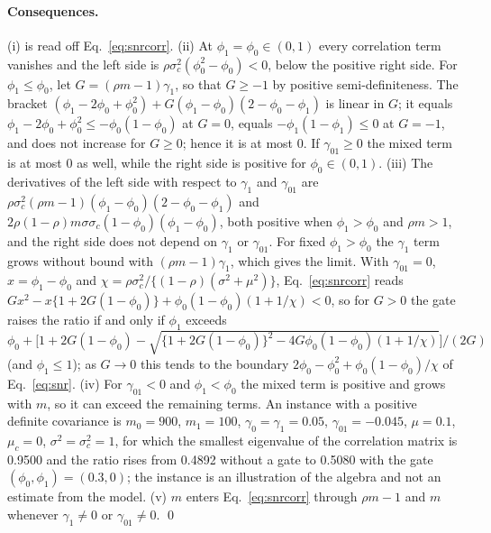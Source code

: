 \paragraph{Consequences.}
(i) is read off Eq.~\eqref{eq:snrcorr}.
(ii) At $\phi_1=\phi_0\in(0,1)$ every correlation term vanishes and the left side is $\rho\sigma_c^2(\phi_0^2-\phi_0)<0$, below the positive
right side.
For $\phi_1\le\phi_0$, let $G=(\rho m-1)\gamma_1$, so that $G\ge-1$ by positive semi-definiteness.
The bracket $(\phi_1-2\phi_0+\phi_0^2)+G(\phi_1-\phi_0)(2-\phi_0-\phi_1)$ is linear in $G$; it equals
$\phi_1-2\phi_0+\phi_0^2\le-\phi_0(1-\phi_0)$ at $G=0$, equals $-\phi_1(1-\phi_1)\le0$ at $G=-1$, and does not increase for $G\ge0$; hence it is
at most $0$.
If $\gamma_{01}\ge0$ the mixed term is at most $0$ as well, while the right side is positive for $\phi_0\in(0,1)$.
(iii) The derivatives of the left side with respect to $\gamma_1$ and $\gamma_{01}$ are
$\rho\sigma_c^2(\rho m-1)(\phi_1-\phi_0)(2-\phi_0-\phi_1)$ and $2\rho(1-\rho)m\sigma\sigma_c(1-\phi_0)(\phi_1-\phi_0)$, both positive when
$\phi_1>\phi_0$ and $\rho m>1$, and the right side does not depend on $\gamma_1$ or $\gamma_{01}$.
For fixed $\phi_1>\phi_0$ the $\gamma_1$ term grows without bound with $(\rho m-1)\gamma_1$, which gives the limit.
With $\gamma_{01}=0$, $x=\phi_1-\phi_0$ and $\chi=\rho\sigma_c^2/\{(1-\rho)(\sigma^2+\mu^2)\}$, Eq.~\eqref{eq:snrcorr} reads
$Gx^2-x\{1+2G(1-\phi_0)\}+\phi_0(1-\phi_0)(1+1/\chi)<0$, so for $G>0$ the gate raises the ratio if and only if $\phi_1$ exceeds
$\phi_0+\big[1+2G(1-\phi_0)-\sqrt{\{1+2G(1-\phi_0)\}^2-4G\phi_0(1-\phi_0)(1+1/\chi)}\big]/(2G)$ (and $\phi_1\le1$); as $G\to0$ this tends to the
boundary $2\phi_0-\phi_0^2+\phi_0(1-\phi_0)/\chi$ of Eq.~\eqref{eq:snr}.
(iv) For $\gamma_{01}<0$ and $\phi_1<\phi_0$ the mixed term is positive and grows with $m$, so it can exceed the remaining terms.
An instance with a positive definite covariance is $m_0=900$, $m_1=100$, $\gamma_0=\gamma_1=0.05$, $\gamma_{01}=-0.045$, $\mu=0.1$, $\mu_c=0$,
$\sigma^2=\sigma_c^2=1$, for which the smallest eigenvalue of the correlation matrix is 0.9500 and the ratio rises from 0.4892 without a
gate to 0.5080 with the gate $(\phi_0,\phi_1)=(0.3,0)$; the instance is an illustration of the algebra and not an estimate from the model.
(v) $m$ enters Eq.~\eqref{eq:snrcorr} through $\rho m-1$ and $m$ whenever $\gamma_1\neq0$ or $\gamma_{01}\neq0$. \qed
